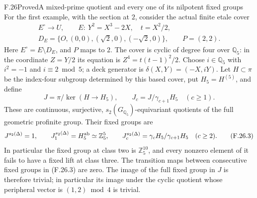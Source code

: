 \begin{statement}{F.26}{Proved}{A mixed-prime quotient and every one of its nilpotent fixed groups}
For the first example, with the section at $2$, consider the actual
finite etale cover
\[
 \begin{gathered}
 E^\circ\longrightarrow U,\qquad
 E:\ Y^2=X^3-2X,\quad t=X^2/2,\\
 D_E=\{O,(0,0),(\sqrt2,0),(-\sqrt2,0)\},
 \qquad P=(2,2).
 \end{gathered}
 \tag{F.26.1}
\]
Here $E^\circ=E\setminus D_E$, and $P$ maps to $2$.
The cover is cyclic of degree four over $\mathbb Q_5$:
in the coordinate $Z=Y/2$ its equation is
$Z^4=t(t-1)^2/2$. Choose $i\in\mathbb Q_5$ with
$i^2=-1$ and $i\equiv2\bmod5$; a deck generator is
$\delta(X,Y)=(-X,iY)$.
Let $H\subset\pi$ be the index-four subgroup determined by this
based cover, put $H_5=H^{(5)}$, and define
\[
 J=\pi/\ker(H\longrightarrow H_5),\qquad
 J_c=J/\gamma_{c+1}H_5\quad(c\ge1).
 \tag{F.26.2}
\]
These are continuous, surjective, $s_2(G_{\mathbb Q_5})$-equivariant
quotients of the full geometric profinite group. Their fixed groups
are
\[
 J^{s_2(\Delta)}=1,\qquad
 J_1^{s_2(\Delta)}=H_5^{\rm ab}\simeq\mathbb Z_5^5,
 \qquad
 J_c^{s_2(\Delta)}
   =\gamma_cH_5/\gamma_{c+1}H_5\quad(c\ge2).
 \tag{F.26.3}
\]
In particular the fixed group at class two is $\mathbb Z_5^{10}$,
and every nonzero element of it fails to have a fixed lift at
class three. The transition maps between consecutive fixed groups
in (F.26.3) are zero. The image of the full fixed group in $J$
is therefore trivial; in particular its image under the cyclic
quotient whose peripheral vector is $(1,2)\bmod4$ is trivial.
\end{statement}
